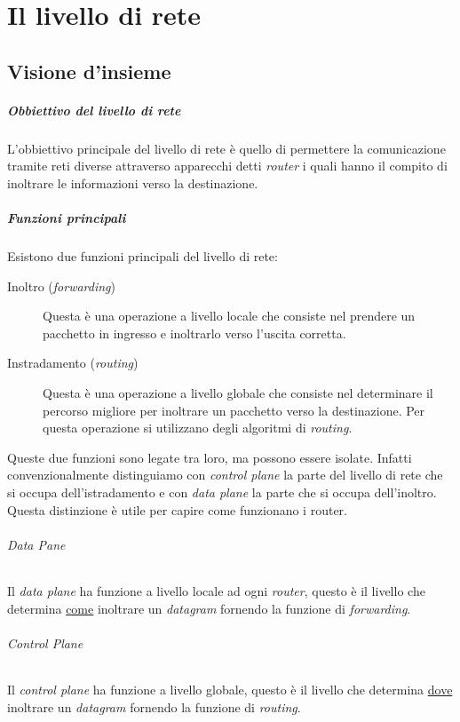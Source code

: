 \chapter{Il livello di rete}
\label{cap:livelloRete}
\thispagestyle{chapterInit}
\section{Visione d'insieme}
    \paragraph{Obbiettivo del livello di rete} L'obbiettivo principale del livello di rete è quello di permettere la comunicazione tramite reti diverse attraverso apparecchi detti \textit{router} i quali hanno il compito di inoltrare le informazioni verso la destinazione.
    \paragraph{Funzioni principali} Esistono due funzioni principali del livello di rete: \begin{description}
        \item[Inoltro (\textit{forwarding})] Questa è una operazione a livello locale che consiste nel prendere un pacchetto in ingresso e inoltrarlo verso l'uscita corretta.
        \item[Instradamento (\textit{routing})] Questa è una operazione a livello globale che consiste nel determinare il percorso migliore per inoltrare un pacchetto verso la destinazione. Per questa operazione si utilizzano degli algoritmi di \textit{routing}.
    \end{description}
    Queste due funzioni sono legate tra loro, ma possono essere isolate. Infatti convenzionalmente distinguiamo con \textit{control plane} la parte del livello di rete che si occupa dell'istradamento e con \textit{data plane} la parte che si occupa dell'inoltro. Questa distinzione è utile per capire come funzionano i router.
    \subparagraph{\textit{Data Pane}} Il \textit{data plane} ha funzione a livello locale ad ogni \textit{router}, questo è il livello che determina \underline{come} inoltrare un \textit{datagram} fornendo la funzione di \textit{forwarding}.
    \subparagraph{\textit{Control Plane}} Il \textit{control plane} ha funzione a livello globale, questo è il livello che determina \underline{dove} inoltrare un \textit{datagram} fornendo la funzione di \textit{routing}.
